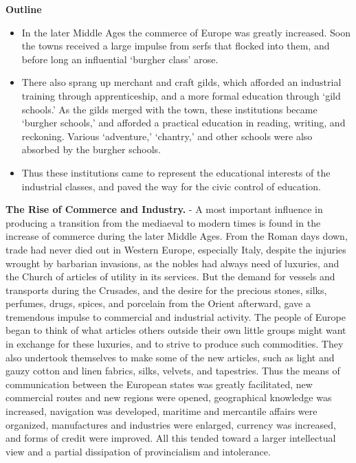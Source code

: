 \documentclass[]{book}
\providecommand{\tightlist}{%
  \setlength{\itemsep}{0pt}\setlength{\parskip}{0pt}}
\begin{document}
\textbf{Outline}

\begin{itemize}
\tightlist
\item
  In the later Middle Ages the commerce of Europe was greatly increased. Soon the towns received a large impulse from serfs that flocked into them, and before long an influential `burgher class' arose.
\item
  There also sprang up merchant and craft gilds, which afforded an industrial training through apprenticeship, and a more formal education through `gild schools.' As the gilds merged with the town, these institutions became `burgher schools,' and afforded a practical education in reading, writing, and reckoning. Various `adventure,' `chantry,' and other schools were also absorbed by the burgher schools.
\item
  Thus these institutions came to represent the educational interests of the industrial classes, and paved the way for the civic control of education.
\end{itemize}

\textbf{The Rise of Commerce and Industry.} - A most important influence in producing a transition from the mediaeval to modern times is found in the increase of commerce during the later Middle Ages. From the Roman days down, trade had never died out in Western Europe, especially Italy, despite the injuries wrought by barbarian invasions, as the nobles had always need of luxuries, and the Church of articles of utility in its services. But the demand for vessels and transports during the Crusades, and the desire for the precious stones, silks, perfumes, drugs, spices, and porcelain from the Orient afterward, gave a tremendous impulse to commercial and industrial activity. The people of Europe began to think of what articles others outside their own little groups might want in exchange for these luxuries, and to strive to produce such commodities. They also undertook themselves to make some of the new articles, such as light and gauzy cotton and linen fabrics, silks, velvets, and tapestries. Thus the means of communication between the European states was greatly facilitated, new commercial routes and new regions were opened, geographical knowledge was increased, navigation was developed, maritime and mercantile affairs were organized, manufactures and industries were enlarged, currency was increased, and forms of credit were improved. All this tended toward a larger intellectual view and a partial dissipation of provincialism and intolerance.
\end{document}
